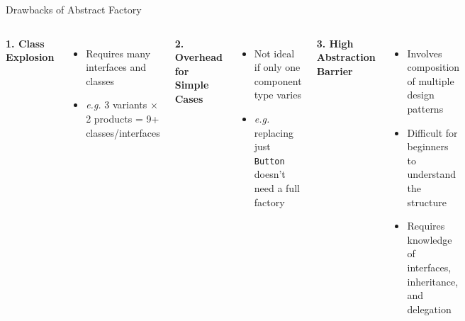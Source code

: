 \documentclass[aspectratio=169, table]{beamer}
\begin{document}
\begin{frame}[fragile]{Drawbacks of Abstract Factory}
\vspace{5pt}
\begin{columns}[T]
\textbf{1. Class Explosion}
\begin{itemize}
\item Requires many interfaces and classes
\item \textit{e.g.} 3 variants × 2 products = 9+ classes/interfaces
\end{itemize}

\textbf{2. Overhead for Simple Cases}
\begin{itemize}
\item Not ideal if only one component type varies
\item \textit{e.g.} replacing just \texttt{Button} doesn’t need a full factory
\end{itemize}

\textbf{3. High Abstraction Barrier}
\begin{itemize}
\item Involves composition of multiple design patterns
\item Difficult for beginners to understand the structure
\item Requires knowledge of interfaces, inheritance, and delegation
\end{itemize}
\end{columns}
\end{frame}
\end{document}
